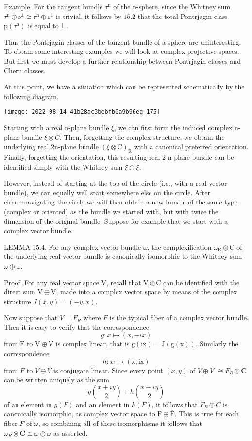 \documentclass[10pt]{article}
\begin{document}
Example. For the tangent bundle $\tau^{\mathrm{n}}$ of the $\mathrm{n}$-sphere, since the Whitney sum $\tau^{\mathrm{n}} \oplus \nu^{1} \cong \tau^{\mathrm{n}} \oplus \varepsilon^{1}$ is trivial, it follows by $15.2$ that the total Pontrjagin class $\mathrm{p}\left(\tau^{\mathrm{n}}\right)$ is equal to 1 .

Thus the Pontrjagin classes of the tangent bundle of a sphere are uninteresting. To obtain some interesting examples we will look at complex projective spaces. But first we must develop a further relationship between Pontrjagin classes and Chern classes.

At this point, we have a situation which can be represented schematically by the following diagram.

\texttt{[image: 2022\_08\_14\_41b28ac3bebfb0a9b96eg-175]}

Starting with a real $\mathrm{n}$-plane bundle $\xi$, we can first form the induced complex n-plane bundle $\xi \otimes C$. Then, forgetting the complex structure, we obtain the underlying real $2 \mathrm{n}$-plane bundle $(\xi \otimes \mathrm{C})_{\mathrm{R}}$ with a canonical preferred orientation. Finally, forgetting the orientation, this resulting real 2 n-plane bundle can be identified simply with the Whitney sum $\xi \oplus \xi$.

However, instead of starting at the top of the circle (i.e., with a real vector bundle), we can equally well start somewhere else on the circle. After circumnavigating the circle we will then obtain a new bundle of the same type (complex or oriented) as the bundle we started with, but with twice the dimension of the original bundle. Suppose for example that we start with a complex vector bundle.

LEMMA 15.4. For any complex vector bundle $\omega$, the complexification $\omega_{\mathrm{R}} \otimes \mathrm{C}$ of the underlying real vector bundle is canonically isomorphic to the Whitney sum $\omega \oplus \bar{\omega}$.

Proof. For any real vector space $\mathrm{V}$, recall that $\mathrm{V} \otimes \mathrm{C}$ can be identified with the direct sum $\mathrm{V} \oplus \mathrm{V}$, made into a complex vector space by means of the complex structure $J(x, y)=(-y, x)$.

Now suppose that $V=F_{R}$ where $F$ is the typical fiber of a complex vector bundle. Then it is easy to verify that the correspondence
$$
g: x \mapsto(x,-i x)
$$
from $\mathrm{F}$ to $\mathrm{V} \oplus \mathrm{V}$ is complex linear, that is $\mathrm{g}(\mathrm{ix})=\mathrm{J}(\mathrm{g}(\mathrm{x}))$. Similarly the correspondence
$$
h: x \cdot \mapsto(\mathrm{x}, \mathrm{ix})
$$
from $F$ to $V \oplus V$ is conjugate linear. Since every point $(x, y)$ of $V \oplus V$ $\cong F_{R} \otimes \mathbf{C}$ can be written uniquely as the sum
$$
g\left(\frac{x+i y}{2}\right)+h\left(\frac{x-i y}{2}\right)
$$
of an element in $g(F)$ and an element in $h(F)$, it follows that $F_{R} \otimes C$ is canonically isomorphic, as complex vector space to $\mathrm{F} \oplus \overline{\mathrm{F}}$. This is true for each fiber $F$ of $\omega$, so combining all of these isomorphisms it follows that $\omega_{R} \otimes \mathbf{C} \cong \omega \oplus \bar{\omega}$ as asserted.
\end{document}
